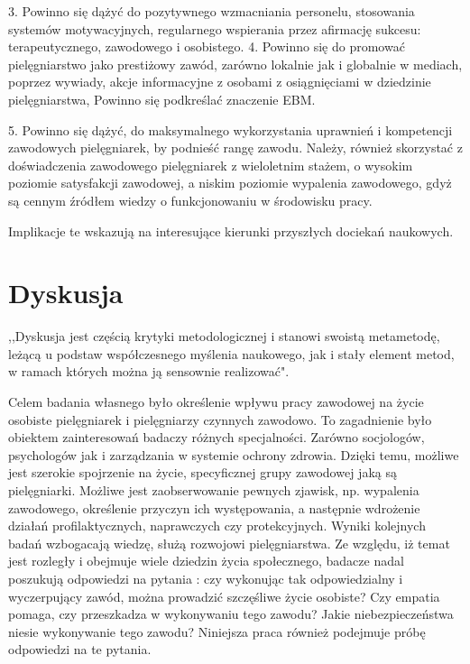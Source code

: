 \documentclass[a4paper,12pt,twoside,openright]{mwrep}
\begin{document}
3.	Powinno się dążyć do pozytywnego wzmacniania personelu, stosowania systemów motywacyjnych, regularnego wspierania przez afirmację sukcesu: terapeutycznego, zawodowego i osobistego.
4.	Powinno się do promować pielęgniarstwo jako prestiżowy zawód, zarówno lokalnie jak i globalnie w mediach, poprzez wywiady, akcje informacyjne z osobami z osiągnięciami w dziedzinie pielęgniarstwa, Powinno się podkreślać znaczenie EBM.

5.	Powinno się dążyć, do maksymalnego wykorzystania uprawnień i kompetencji zawodowych pielęgniarek, by podnieść rangę zawodu. Należy, również skorzystać z doświadczenia zawodowego pielęgniarek z wieloletnim stażem, o wysokim poziomie satysfakcji zawodowej, a niskim poziomie wypalenia zawodowego, gdyż są cennym źródłem wiedzy o funkcjonowaniu w środowisku pracy.


Implikacje te wskazują na interesujące kierunki przyszłych dociekań naukowych.


\section*{Dyskusja}
,,Dyskusja jest częścią krytyki metodologicznej i stanowi swoistą metametodę, leżącą u podstaw współczesnego myślenia naukowego, jak i stały element metod, w ramach których można ją sensownie realizować"\cite{krytyka}.


Celem badania własnego było określenie wpływu pracy zawodowej na życie osobiste pielęgniarek i pielęgniarzy czynnych zawodowo. To zagadnienie było obiektem zainteresowań badaczy różnych specjalności. Zarówno socjologów, psychologów jak i zarządzania w systemie ochrony zdrowia.  Dzięki temu, możliwe jest szerokie spojrzenie na życie, specyficznej grupy zawodowej jaką są pielęgniarki. Możliwe jest zaobserwowanie pewnych zjawisk, np. wypalenia zawodowego, określenie przyczyn ich występowania, a następnie wdrożenie działań profilaktycznych, naprawczych czy protekcyjnych. Wyniki kolejnych badań wzbogacają wiedzę, służą rozwojowi pielęgniarstwa. Ze względu, iż temat jest rozległy i obejmuje wiele dziedzin życia społecznego, badacze nadal poszukują odpowiedzi na pytania : czy wykonując tak odpowiedzialny i wyczerpujący zawód, można prowadzić szczęśliwe życie osobiste? Czy empatia pomaga, czy przeszkadza w wykonywaniu tego zawodu? Jakie niebezpieczeństwa niesie wykonywanie tego zawodu? Niniejsza praca również podejmuje próbę odpowiedzi na te pytania.

\end{document}
